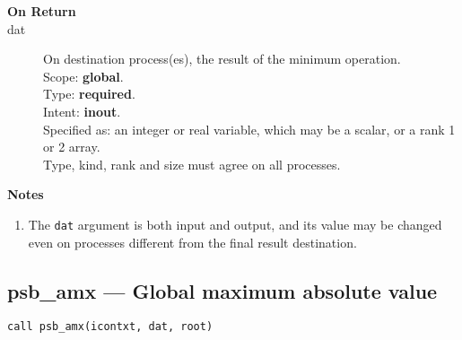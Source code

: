 \begin{description}
\item[\bf On Return]
\item[dat] On destination process(es), the result of the minimum operation.\\
Scope: {\bf global}.\\
Type: {\bf required}.\\
Intent: {\bf inout}.\\
Specified as: an integer  or  real variable, which may be a
scalar, or a rank 1 or 2 array. \\
Type, kind, rank and size must agree on all processes.
\end{description}


{\par\noindent\large\bfseries Notes}
\begin{enumerate}
\item The \verb|dat| argument is both input and output, and its
  value may be changed even on processes different from the final
  result destination.
\end{enumerate}

\clearpage\subsection*{psb\_amx --- Global maximum absolute value}

\begin{verbatim}
call psb_amx(icontxt, dat, root)
\end{verbatim}

